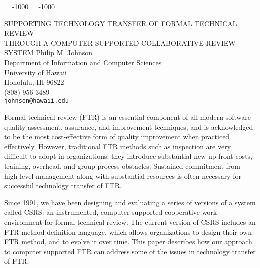 



\pagestyle{empty}
\thispagestyle{empty}

\sloppy
\clubpenalty = -1000
\widowpenalty = -1000
\setlength{\baselineskip}{11.5pt}

\setlength{\baselineskip}{11.5pt}
\pagestyle{empty}
\thispagestyle{empty}


\makeieeetitle
  {SUPPORTING TECHNOLOGY TRANSFER OF FORMAL TECHNICAL REVIEW \\
   THROUGH A COMPUTER SUPPORTED COLLABORATIVE REVIEW SYSTEM}
  {Philip M. Johnson\\
   Department of Information and Computer Sciences\\
   University of Hawaii\\
   Honolulu, HI 96822\\
   (808) 956-3489\\
   {\tt johnson@hawaii.edu}}

   
   \makeieeeabstract 
   {

   Formal technical review (FTR) is an essential component of all
   modern software quality assessment, assurance, and improvement techniques,
   and is acknowledged to be the most cost-effective form of quality
   improvement when practiced effectively.  However, traditional FTR
   methods such as inspection are very difficult to adopt
   in organizations: they introduce substantial new up-front
   costs, training, overhead, and group process obstacles.  Sustained
   commitment from high-level management along with substantial
   resources is often necessary for successful technology transfer of
   FTR.
  
   Since 1991, we have been designing and evaluating a series of
   versions of a system called CSRS: an instrumented, computer-supported
   cooperative work environment for formal technical review.  The
   current version of CSRS includes an FTR method definition language,
   which allows organizations to design their own FTR method, and to
   evolve it over time. This paper describes how our approach to
   computer supported FTR can address some of the issues in technology
   transfer of FTR.

   }

